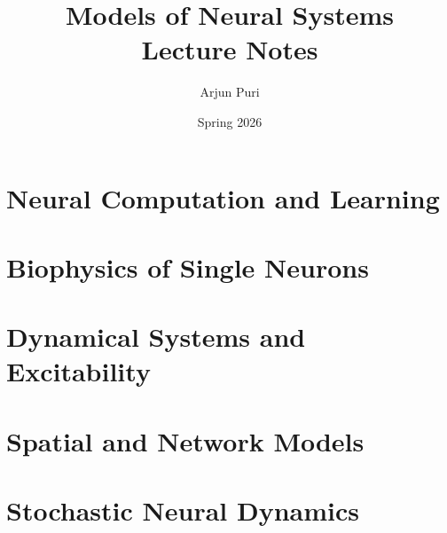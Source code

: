 \documentclass{coursenotes}
\title{Models of Neural Systems\\[0.5em]
  \large Lecture Notes}
\author{Arjun Puri}
\date{Spring 2026}
\begin{document}
\frontmatter

\tableofcontents



\mainmatter

\part{Neural Computation and Learning}




\part{Biophysics of Single Neurons}





\part{Dynamical Systems and Excitability}




\part{Spatial and Network Models}





\part{Stochastic Neural Dynamics}


\backmatter



\printbibliography[heading=bibintoc]
\end{document}
